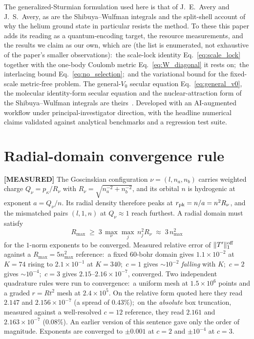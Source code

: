 \documentclass[aps,pra,twocolumn,superscriptaddress,longbibliography]{revtex4-2}
\begin{document}
\begin{acknowledgments}
The generalized-Sturmian formulation used here is that of J.~E.~Avery and
J.~S.~Avery, as are the Shibuya--Wulfman integrals and the split-shell account
of why the helium ground state in particular resists the method.  To these this
paper adds its reading as a quantum-encoding target, the resource measurements,
and the results we claim as our own, which are (the list is enumerated,
not exhaustive of the paper's smaller observations):\ the scale-lock identity
Eq.~\eqref{eq:scale_lock} together with the one-body Coulomb metric
Eq.~\eqref{eq:W_diagonal} it rests on;\ the interlacing bound
Eq.~\eqref{eq:no_selection};\ and the variational bound for the fixed-scale
metric-free problem.  The general-$V_0$ secular equation
Eq.~\eqref{eq:general_v0}, the molecular identity-form secular equation and the
nuclear-attraction form of the Shibuya--Wulfman integrals are
theirs~\cite{avery2017}.  Developed with an AI-augmented workflow under
principal-investigator direction, with the headline numerical claims validated against
analytical benchmarks and a regression test suite.
\end{acknowledgments}

\appendix

\section{Radial-domain convergence rule}
\label{app:box}

\textbf{[MEASURED]} The Goscinskian configuration $\nu=(l,n_a,n_b)$ carries
weighted charge $Q_\nu=p_\kappa/R_\nu$ with $R_\nu=\sqrt{n_a^{-2}+n_b^{-2}}$,
and its orbital $n$ is hydrogenic at exponent $a=Q_\nu/n$.  Its radial density
therefore peaks at $r_{\rm pk}=n/a=n^{2}R_\nu$, and the mismatched pairs
$(l,1,n)$ at $Q_\nu\!\approx\!1$ reach furthest.  A radial domain must satisfy
\begin{equation}
R_{\max}\;\ge\;3\,\max_\nu\max_j\,n_j^{2}R_\nu\;\approx\;3\,n_{\max}^{2}
\label{eq:boxrule}
\end{equation}
for the $1$-norm exponents to be converged.  Measured relative error of
$\|T'\|_1^{\rm off}$ against a $R_{\max}=5n_{\max}^{2}$ reference:\ a fixed
$60$-bohr domain gives $1.1\times10^{-2}$ at $K=74$ rising to $2.1\times10^{-1}$
at $K=340$;\ $c=1$ gives $\sim\!10^{-2}$ \emph{falling} with $K$;\ $c=2$ gives
$\sim\!10^{-4}$;\ $c=3$ gives $2.15$--$2.16\times10^{-7}$, converged.  Two independent quadrature
rules were run to convergence:\ a uniform mesh at $1.5\times10^{6}$ points and a
graded $r=Rt^{2}$ mesh at $2.4\times10^{5}$.  On the relative form quoted here
they read $2.147$ and $2.156\times10^{-7}$ (a spread of $0.43\%$);\ on the
\emph{absolute} box truncation, measured against a well-resolved
$c=12$ reference, they read $2.161$ and $2.163\times10^{-7}$ ($0.08\%$).  An
earlier version of this sentence gave only the order of magnitude.  Exponents are converged to
$\pm0.001$ at $c=2$ and $\pm10^{-4}$ at $c=3$.
\end{document}
